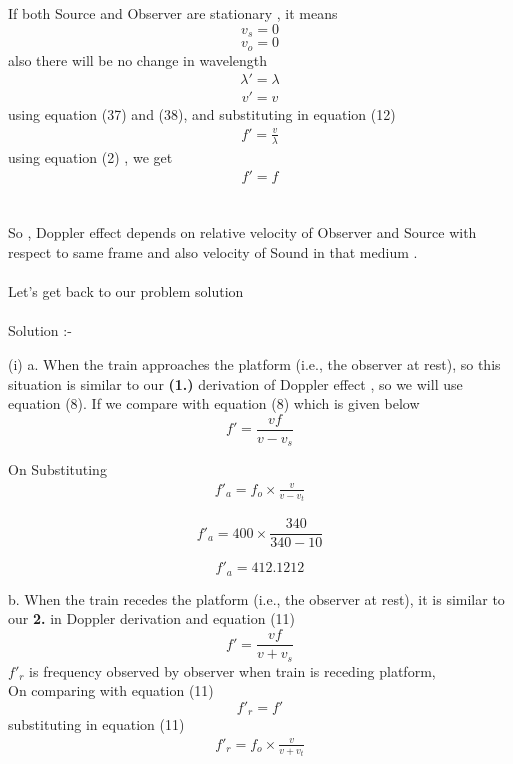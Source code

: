 \documentclass[journal,12pt,twocolumn]{IEEEtran}
\theoremstyle{remark}
\begin{document}
If both Source and Observer are stationary , it means 
$$v_s = 0$$
$$v_o = 0$$
also there will be no change in wavelength 
\begin{align}\lambda' = \lambda\end{align}
\begin{align}v'= v\end{align}
using equation (37) and (38), and substituting in equation (12) 
\begin{align}f' = \frac{v}{\lambda}\end{align}
using equation (2) , we get 
\begin{align}f' = f\end{align}\\\\

So , Doppler effect depends on relative velocity of Observer and Source with respect to same frame and also velocity of Sound in that medium .\\\\
Let's get back to our problem solution\\\\
Solution :-\\
         \begin{table}[h]
        
    \end{table}

(i)  a. When the train approaches the platform (i.e., the observer at rest), so this situation is similar to our \textbf{(1.)} derivation of Doppler effect , so we will use equation (8). If we compare with equation (8) which is given below
$$f' = \frac{v f}{v- v_s }$$
 
On Substituting
\begin{align}f'_a=f_o\times\frac{v}{v-v_t}\end{align}

$$f'_a=400\times\frac{340}{340-10}$$

$$f'_a=412.1212$$
\bigskip

b. When the train recedes the platform (i.e., the observer at rest), it is similar to our \textbf{2.} in Doppler derivation and equation (11)
$$f' = \frac{v f}{v+ v_s }$$
$f'_r $ is frequency observed by observer when train is receding platform,\\
On comparing with equation (11) 
$$f'_r =f'$$
substituting in equation (11)
\begin{align}f'_r=f_o\times\frac{v}{v+v_t}\end{align}
\end{document}
